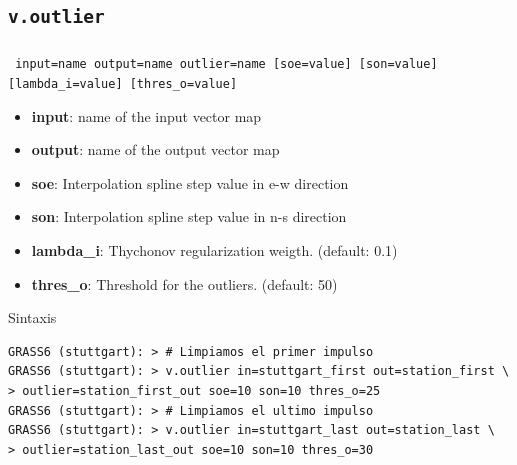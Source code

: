 \subsection{\texttt{v.outlier}}
\begin{frame}[fragile,shrink=5]
  \frametitle{}
  \begin{beamerboxesrounded}[shadow=true]{\textbf{}
    \texttt{ input=name output=name outlier=name [soe=value] [son=value] 
    [lambda\_i=value] [thres\_o=value]}}
    \begin{itemize}
      \item \textbf{input}: name of the input vector map
      \item \textbf{output}: name of the output vector map
      \item \textbf{soe}: Interpolation spline step value in e-w direction
      \item \textbf{son}: Interpolation spline step value in n-s direction
      \item \textbf{lambda\_i}: Thychonov regularization weigth. (default: 0.1)
      \item \textbf{thres\_o}: Threshold for the outliers. (default: 50)
    \end{itemize}
  \end{beamerboxesrounded}
  \begin{beamerboxesrounded}[shadow=true]{Sintaxis}
\scriptsize
\begin{verbatim}
GRASS6 (stuttgart): > # Limpiamos el primer impulso
GRASS6 (stuttgart): > v.outlier in=stuttgart_first out=station_first \
> outlier=station_first_out soe=10 son=10 thres_o=25
GRASS6 (stuttgart): > # Limpiamos el ultimo impulso
GRASS6 (stuttgart): > v.outlier in=stuttgart_last out=station_last \
> outlier=station_last_out soe=10 son=10 thres_o=30
\end{verbatim}
\end{beamerboxesrounded}
\end{frame}
